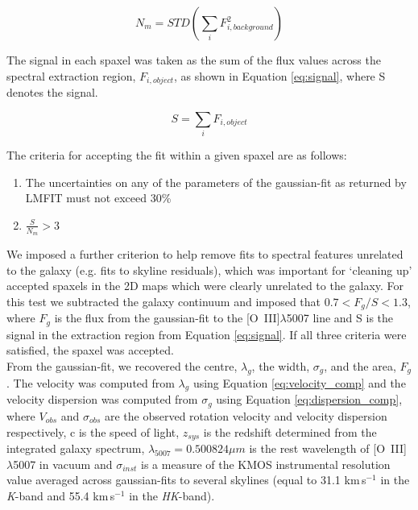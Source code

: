 \documentclass[fleqn,usenatbib]{mnras}
\begin{document}
\begin{equation}\label{eq:noise}
    N_{m} = STD\left(\sum_{i}F_{i,background}^{2}\right)
\end{equation}


The signal in each spaxel was taken as the sum of the flux values across the spectral extraction region, $F_{i,object}$, as shown in Equation \ref{eq:signal}, where S denotes the signal.

\begin{equation}\label{eq:signal}
    S = \sum_{i}F_{i,object}
\end{equation}


The criteria for accepting the fit within a given spaxel are as follows:

\begin{enumerate}[label=(\roman*),align=left]
\item The uncertainties on any of the parameters of the gaussian-fit as returned by {\scriptsize LMFIT} must not exceed 30\%
\item $\frac{S}{N_{m}} > 3$
\end{enumerate}


We imposed a further criterion to help remove fits to spectral features unrelated to the galaxy (e.g. fits to skyline residuals), which was important for `cleaning up' accepted spaxels in the 2D maps which were clearly unrelated to the galaxy. For this test we subtracted the galaxy continuum and imposed that $0.7 < F_{g}/{S} < 1.3$, where $F_{g}$ is the flux from the gaussian-fit to the [O~{\sc III}]$\lambda$5007 line and S is the signal in the extraction region from Equation \ref{eq:signal}. If all three criteria were satisfied, the spaxel was accepted. \\


From the gaussian-fit, we recovered the centre, $\lambda_{g}$, the width, $\sigma_{g}$, and the area, $F_{g}$.
The velocity was computed from $\lambda_{g}$ using Equation \ref{eq:velocity_comp} and the velocity dispersion was computed from $\sigma_{g}$ using Equation \ref{eq:dispersion_comp}, where $V_{obs}$ and $\sigma_{obs}$ are the observed rotation velocity and velocity dispersion respectively, c is the speed of light, $z_{sys}$ is the redshift determined from the integrated galaxy spectrum, $\lambda_{5007} = 0.500824\mu m$ is the rest wavelength of [O~{\sc III}]$\lambda$5007 in vacuum and $\sigma_{inst}$ is a measure of the KMOS instrumental resolution value averaged across gaussian-fits to several skylines (equal to 31.1 km\,s$^{-1}$ in the {\it K}-band and 55.4 km\,s$^{-1}$ in the {\it HK}-band).
\end{document}
